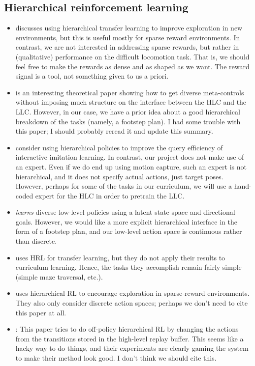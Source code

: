 \documentclass[a4paper]{article}
\newcommand{\highlight}[1]{{\leavevmode\color{blue} #1}}
\begin{document}
\subsection*{Hierarchical reinforcement learning}

\begin{itemize}
  \item \cite{heess2016learning} discusses using hierarchical transfer learning to improve exploration in new environments, but this is useful mostly for sparse reward environments.
    In contrast, we are not interested in addressing sparse rewards, but rather in (qualitative) performance on the difficult locomotion task.
    That is, we should feel free to make the rewards as dense and as shaped as we want.
    The reward signal is a tool, not something given to us a priori.

  \item \cite{hausman2018learning} is an interesting theoretical paper showing how to get diverse meta-controls without imposing much structure on the interface between the HLC and the LLC.
    However, in our case, we have a prior idea about a good hierarchical breakdown of the tasks (namely, a footstep plan). \highlight{I had some trouble with this paper; I should probably reread it and update this summary.}

  \item \cite{daume18ilrl} consider using hierarchical policies to improve the query efficiency of interactive imitation learning.
    In contrast, our project does not make use of an expert.
    Even if we do end up using motion capture, such an expert is not hierarchical, and it does not specify actual actions, just target poses.
    However, perhaps for some of the tasks in our curriculum, we will use a hand-coded expert for the HLC in order to pretrain the LLC.

  \item \cite{vezhnevets2017feudal} \emph{learns} diverse low-level policies using a latent state space and directional goals. However, we would like a more explicit hierarchical interface in the form of a footstep plan, and our low-level action space is continuous rather than discrete.

  \item \cite{frans2018meta} uses HRL for transfer learning, but they do not apply their results to curriculum learning.
    Hence, the tasks they accomplish remain fairly simple (simple maze traversal, etc.).

  \item \cite{kulkarni2016hierarchical} uses hierarchical RL to encourage exploration in sparse-reward environments.
    They also only consider discrete action spaces; perhaps we don't need to cite this paper at all.
  \item \cite{nachum2018data}: This paper tries to do off-policy hierarchical RL by changing the actions from the transitions stored in the high-level replay buffer. This seems like a hacky way to do things, and their experiments are clearly gaming the system to make their method look good. I don't think we should cite this.
\end{itemize}
\end{document}
